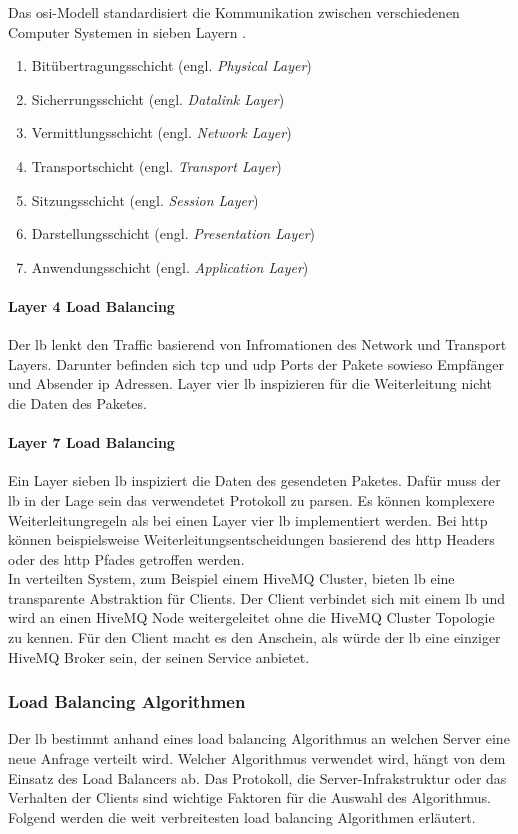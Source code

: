 Das \ac{osi}-Modell standardisiert die Kommunikation zwischen verschiedenen Computer Systemen in sieben Layern \cite{WhatOSIModel}.
\begin{enumerate}
    \item Bitübertragungsschicht (engl. \textit{Physical Layer})
    \item Sicherrungsschicht (engl. \textit{Datalink Layer})
    \item Vermittlungsschicht (engl. \textit{Network Layer})
    \item Transportschicht (engl. \textit{Transport Layer})
    \item Sitzungsschicht (engl. \textit{Session Layer})
    \item Darstellungsschicht (engl. \textit{Presentation Layer})
    \item Anwendungsschicht (engl. \textit{Application Layer})
\end{enumerate}
\paragraph{Layer 4 Load Balancing}
Der \ac{lb} lenkt den Traffic basierend von Infromationen des Network und Transport Layers. Darunter befinden sich \ac{tcp} und \ac{udp} Ports der Pakete sowieso Empfänger und Absender \ac{ip} Adressen. Layer vier \ac{lb} inspizieren für die Weiterleitung nicht die Daten des Paketes.
\cite{WhatLoadBalancer}

\paragraph{Layer 7 Load Balancing}
Ein Layer sieben \ac{lb} inspiziert die Daten des gesendeten Paketes. Dafür muss der \ac{lb} in der Lage sein das verwendetet Protokoll zu parsen. Es können komplexere Weiterleitungregeln als bei einen Layer vier \ac{lb} implementiert werden. Bei \ac{http} können beispielsweise Weiterleitungsentscheidungen basierend des \ac{http} Headers oder des \ac{http} Pfades getroffen werden.
\cite{WhatLoadBalancer}
\\
In verteilten System, zum Beispiel einem HiveMQ Cluster, bieten \acl{lb} eine transparente Abstraktion für Clients. Der Client verbindet sich mit einem \ac{lb} und wird an einen HiveMQ Node weitergeleitet ohne die HiveMQ Cluster Topologie zu kennen. Für den Client macht es den Anschein, als würde der \ac{lb} eine einziger HiveMQ Broker sein, der seinen Service anbietet.

\subsubsection{Load Balancing Algorithmen} \label{sb:lb-algo}
Der \acl{lb} bestimmt anhand eines load balancing Algorithmus an welchen Server eine neue Anfrage verteilt wird.
Welcher Algorithmus verwendet wird, hängt von dem Einsatz des Load Balancers ab.
Das Protokoll, die Server-Infrakstruktur oder das Verhalten der Clients sind wichtige Faktoren für die Auswahl des Algorithmus.
\\
Folgend werden die weit verbreitesten load balancing Algorithmen erläutert.

